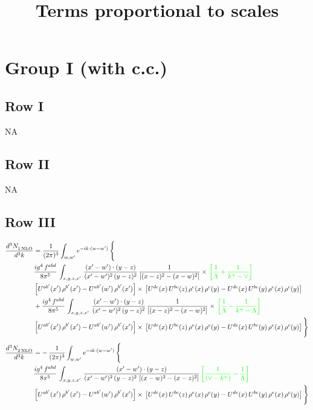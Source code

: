 \documentclass[9pt]{article}
\title{Terms proportional to scales}
\author{}
\date{}
\numberwithin{equation}{section}
\begin{document}
\maketitle
\section{Group I (with c.c.)}
\subsection{Row I}
\textsc{NA}
\subsection{Row II}
\textsc{NA}
\subsection{Row III}
\begin{align}
   \frac{d^{3}N_{1\,\rm NLO}^{\rm}}{d^{3}k}  & = \frac{1}{(2\pi)^{3}}  \int_{w, w^\prime} e^{-ik\cdot(w-w^\prime)}\, \Bigg\{\notag \\ & \frac{ig^{4}\,f^{abd}}{8\pi^{5}}\,\int_{x,y,z,x'}\, \frac{(x'-w')\cdot (y-z)}{(x'-w')^{2}\,(y-z)^{2}}\, \frac{1}{\left[(x-z)^{2}-(x-w)^{2}\right]}\times\, {\color{green}\left[\frac{1}{\Lambda}+\frac{1}{k^{+}-\vee}\right]}\notag \\ & \left[U^{ab'}(x')\,\rho^{b'}(x')-U^{ab'}(w')\, \rho^{b'}(x')\right]\times\, \left[U^{de}(x)\,U^{bc}(z)\, \rho^{e}(x)\,\rho^{c}(y)-U^{de}(x)\,U^{bc}(y)\,\rho^{e}(x)\,\rho^{c}(y)\right]\notag \\ &  + \frac{ig^{4}\,f^{abd}}{8\pi^{5}}\,\int_{x,y,z,x'}\, \frac{(x'-w')\cdot (y-z)}{(x'-w')^{2}\,(y-z)^{2}}\, \frac{1}{\left[(x-z)^{2}-(x-w)^{2}\right]}\times\, {\color{green}\left[\frac{1}{\Lambda}-\frac{1}{k^{+}-\Lambda}\right]}\notag \\ & \left[U^{ab'}(x')\,\rho^{b'}(x')-U^{ab'}(w')\, \rho^{b'}(x')\right]\times\, \left[U^{de}(x)\,U^{bc}(z)\, \rho^{e}(x)\,\rho^{c}(y)-U^{de}(x)\,U^{bc}(y)\,\rho^{e}(x)\,\rho^{c}(y)\right]\Bigg\}
\end{align}
\begin{align}
   \frac{d^{3}N_{2\,\rm NLO}^{\rm}}{d^{3}k}  & = -\,\frac{1}{(2\pi)^{3}}  \int_{w, w^\prime} e^{-ik\cdot(w-w^\prime)}\, \Bigg\{\notag \\ & \frac{ig^{4}\, f^{abd}}{8\pi^{5}}\, \int_{x,y,z,x'}\,\frac{(x'-w')\cdot (y-z)}{(x'-w')^{2}\, (y-z)^{2}\,\left[(x-w)^{2}-(x-z)^{2}\right]}\,{\color{green}\left[\frac{1}{(\vee-k^{+})}-\frac{1}{\Lambda}\right]} \notag \\ & \left[U^{ab'}(x')\,\rho^{b'}(x')-U^{ab'}(w')\, \rho^{b'}(x')\right]\times\,\left[U^{de}(x)\,U^{bc}(z)\, \rho^{e}(x)\,\rho^{c}(y)-U^{de}(x)\,U^{bc}(y)\,\rho^{e}(x)\,\rho^{c}(y)\right]\Bigg\} 
\end{align}
\end{document}
